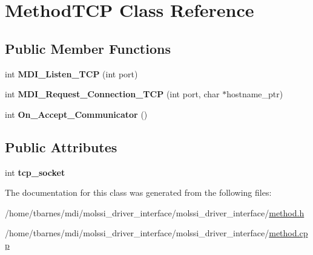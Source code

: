 \hypertarget{classMethodTCP}{\section{Method\-T\-C\-P Class Reference}
\label{classMethodTCP}
}
\subsection*{Public Member Functions}
\begin{DoxyCompactItemize}
\item 
\hypertarget{classMethodTCP_ac57708cf27dc538f3545e831147f84a9}{int {\bfseries M\-D\-I\-\_\-\-Listen\-\_\-\-T\-C\-P} (int port)}\label{classMethodTCP_ac57708cf27dc538f3545e831147f84a9}

\item 
\hypertarget{classMethodTCP_a5e3e9cf897c337db7149d857e7457278}{int {\bfseries M\-D\-I\-\_\-\-Request\-\_\-\-Connection\-\_\-\-T\-C\-P} (int port, char $\ast$hostname\-\_\-ptr)}\label{classMethodTCP_a5e3e9cf897c337db7149d857e7457278}

\item 
\hypertarget{classMethodTCP_a2c66a5df73ca84946a949b76cbd97908}{int {\bfseries On\-\_\-\-Accept\-\_\-\-Communicator} ()}\label{classMethodTCP_a2c66a5df73ca84946a949b76cbd97908}

\end{DoxyCompactItemize}
\subsection*{Public Attributes}
\begin{DoxyCompactItemize}
\item 
\hypertarget{classMethodTCP_ae89fa007b11d6a3e97200d1f4d5033b4}{int {\bfseries tcp\-\_\-socket}}\label{classMethodTCP_ae89fa007b11d6a3e97200d1f4d5033b4}

\end{DoxyCompactItemize}


The documentation for this class was generated from the following files\-:\begin{DoxyCompactItemize}
\item 
/home/tbarnes/mdi/molssi\-\_\-driver\-\_\-interface/molssi\-\_\-driver\-\_\-interface/\hyperlink{method_8h}{method.\-h}\item 
/home/tbarnes/mdi/molssi\-\_\-driver\-\_\-interface/molssi\-\_\-driver\-\_\-interface/\hyperlink{method_8cpp}{method.\-cpp}\end{DoxyCompactItemize}
